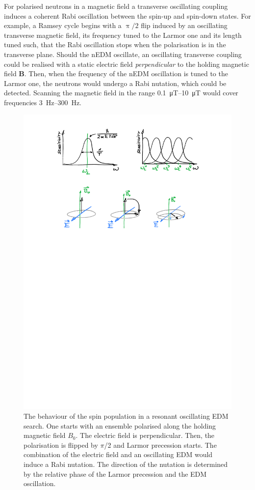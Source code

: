 For polarised neutrons in a magnetic field a transverse oscillating coupling induces a coherent Rabi oscillation between the spin-up and spin-down states.
For example, a Ramsey cycle begins with a $\uppi/2$ flip induced by an oscillating transverse magnetic field, its frequency tuned to the Larmor one and its length tuned such, that the Rabi oscillation stops when the polarisation is in the transverse plane. Should the nEDM oscillate, an oscillating transverse coupling could be realised with a static electric field \emph{perpendicular} to the holding magnetic field $\mathbf{B}$. Then, when the frequency of the nEDM oscillation is tuned to the Larmor one, the neutrons would undergo a Rabi nutation, which could be detected. Scanning the magnetic field in the range \SIrange[range-phrase=--]{0.1}{10}{\micro\tesla} would cover frequencies \SIrange[range-phrase=--]{3}{300}{\hertz}.

\begin{figure}
  \centering
  \includegraphics[width=\linewidth]{gfx/axions/resonant_effect.pdf}
  \caption{The behaviour of the spin population in a resonant oscillating EDM search.
  One starts with an ensemble polarised along the holding magnetic field $B_0$.
  The electric field is perpendicular.
  Then, the polarisation is flipped by $\pi$/2 and Larmor precession starts.
  The combination of the electric field and an oscillating EDM would induce a Rabi nutation.
  The direction of the nutation is determined by the relative phase of the Larmor precession and the EDM oscillation.}\label{fig:axions_resonant_effect}
\end{figure}

